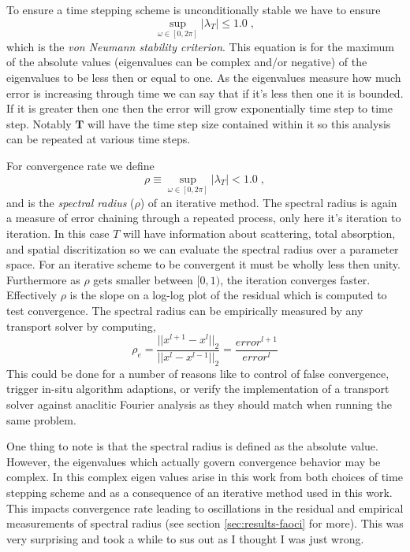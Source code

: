 To ensure a time stepping scheme is unconditionally stable we have to ensure
\begin{equation}
    \sup_{\omega\in[0,2\pi]}|\lambda_T| \leq 1.0 \; ,
\end{equation}
which is the \emph{von Neumann stability criterion}.
This equation is for the maximum of the absolute values (eigenvalues can be complex and/or negative) of the eigenvalues to be less then or equal to one.
As the eigenvalues measure how much error is increasing through time we can say that if it's less then one it is bounded.
If it is greater then one then the error will grow exponentially time step to time step.
Notably $\bm{T}$ will have the time step size contained within it so this analysis can be repeated at various time steps.

For convergence rate we define
\begin{equation}
    \rho \equiv \sup_{\omega\in[0,2\pi]}|\lambda_T| < 1.0 \; ,
\end{equation}
and is the \emph{spectral radius} ($\rho$) of an iterative method.
The spectral radius is again a measure of error chaining through a repeated process, only here it's iteration to iteration.
In this case $T$ will have information about scattering, total absorption, and spatial discritization so we can evaluate the spectral radius over a parameter space.
For an iterative scheme to be convergent it must be wholly less then unity.
Furthermore as $\rho$ gets smaller between $[0,1)$, the iteration converges faster.
Effectively $\rho$ is the slope on a log-log plot of the residual which is computed to test convergence.
The spectral radius can be empirically measured by any transport solver by computing,
\begin{equation}
    \rho_e = \frac{||x^{l+1 } - x^{l}||_{2}}{||x^{l} - x^{l-1}||_{2}} = \frac{error^{l+1}}{error^{l}}
\end{equation}
This could be done for a number of reasons like to control of false convergence, trigger in-situ algorithm adaptions, or verify the implementation of a transport solver against anaclitic Fourier analysis as they should match when running the same problem.

One thing to note is that the spectral radius is defined as the absolute value.
However, the eigenvalues which actually govern convergence behavior may be complex.
In this complex eigen values arise in this work from both choices of time stepping scheme \cite{ilham_phd, ilham} and as a consequence of an iterative method used in this work.
This impacts convergence rate leading to oscillations in the residual and empirical measurements of spectral radius (see section \ref{sec:results-faoci} for more).
This was very surprising and took a while to sus out as I thought I was just wrong.

